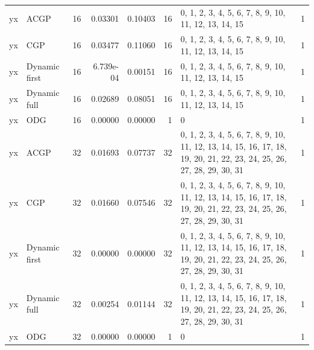 \documentclass[10pt,a4paper]{article}
\begin{document}
\begin{longtable}{@{}p{23mm}p{29mm}rrrrp{36mm}r@{}}
yx & ACGP & 16 & 0.03301 & 0.10403 & 16 & 0, 1, 2, 3, 4, 5, 6, 7, 8, 9, 10, 11, 12, 13, 14, 15 & 1 \\
yx & CGP & 16 & 0.03477 & 0.11060 & 16 & 0, 1, 2, 3, 4, 5, 6, 7, 8, 9, 10, 11, 12, 13, 14, 15 & 1 \\
yx & Dynamic first & 16 & 6.739e-04 & 0.00151 & 16 & 0, 1, 2, 3, 4, 5, 6, 7, 8, 9, 10, 11, 12, 13, 14, 15 & 1 \\
yx & Dynamic full & 16 & 0.02689 & 0.08051 & 16 & 0, 1, 2, 3, 4, 5, 6, 7, 8, 9, 10, 11, 12, 13, 14, 15 & 1 \\
yx & ODG & 16 & 0.00000 & 0.00000 & 1 & 0 & 1 \\
yx & ACGP & 32 & 0.01693 & 0.07737 & 32 & 0, 1, 2, 3, 4, 5, 6, 7, 8, 9, 10, 11, 12, 13, 14, 15, 16, 17, 18, 19, 20, 21, 22, 23, 24, 25, 26, 27, 28, 29, 30, 31 & 1 \\
yx & CGP & 32 & 0.01660 & 0.07546 & 32 & 0, 1, 2, 3, 4, 5, 6, 7, 8, 9, 10, 11, 12, 13, 14, 15, 16, 17, 18, 19, 20, 21, 22, 23, 24, 25, 26, 27, 28, 29, 30, 31 & 1 \\
yx & Dynamic first & 32 & 0.00000 & 0.00000 & 32 & 0, 1, 2, 3, 4, 5, 6, 7, 8, 9, 10, 11, 12, 13, 14, 15, 16, 17, 18, 19, 20, 21, 22, 23, 24, 25, 26, 27, 28, 29, 30, 31 & 1 \\
yx & Dynamic full & 32 & 0.00254 & 0.01144 & 32 & 0, 1, 2, 3, 4, 5, 6, 7, 8, 9, 10, 11, 12, 13, 14, 15, 16, 17, 18, 19, 20, 21, 22, 23, 24, 25, 26, 27, 28, 29, 30, 31 & 1 \\
yx & ODG & 32 & 0.00000 & 0.00000 & 1 & 0 & 1 \\
\end{longtable}\normalsize\setlength{\tabcolsep}{6pt}
\clearpage
\end{document}
